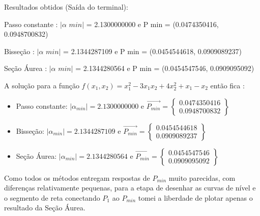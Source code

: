 \documentclass[10pt, a4paper]{article}
\begin{document}
Resultados obtidos (Saída do terminal):
\newline


Passo constante : $|\alpha \,\, min|$ = 2.1300000000 e P min = (0.0474350416, 0.0948700832)

Bisseção        : $|\alpha \,\, min|$ = 2.1344287109 e P min = (0.0454544618, 0.0909089237)

Seção Áurea     : $|\alpha \,\,  min|$ = 2.1344280564 e P min = (0.0454547546, 0.0909095092)\newline

A solução para a função $f(x_1, x_2) = x_1^2 - 3x_1x_2 + 4x_2^2 + x_1 - x_2$ então fica :
\newline

\begin{itemize}
  \item Passo constante: $|\alpha_{min}| = 2.1300000000$ e $\overrightarrow{P_{min}} =  
  \begin{Bmatrix}
    0.0474350416 \\ 0.0948700832
  \end{Bmatrix}$
  \item Bisseção: $|\alpha_{min}| = 2.1344287109$ e $\overrightarrow{P_{min}} =  
  \begin{Bmatrix}
    0.0454544618 \\ 0.0909089237
  \end{Bmatrix}$
  \item Seção Áurea: $|\alpha_{min}| = 2.1344280564$ e $\overrightarrow{P_{min}} =  
  \begin{Bmatrix}
    0.0454547546 \\ 0.0909095092
  \end{Bmatrix}$
\end{itemize}

Como todos os métodos entregam respostas de $P_{min}$ muito parecidas, com diferenças relativamente pequenas,
para a etapa de desenhar as curvas de nível e o segmento de reta conectando $P_1$ ao $P_{min}$ tomei a liberdade
de plotar apenas o resultado da Seção Áurea.
\end{document}
